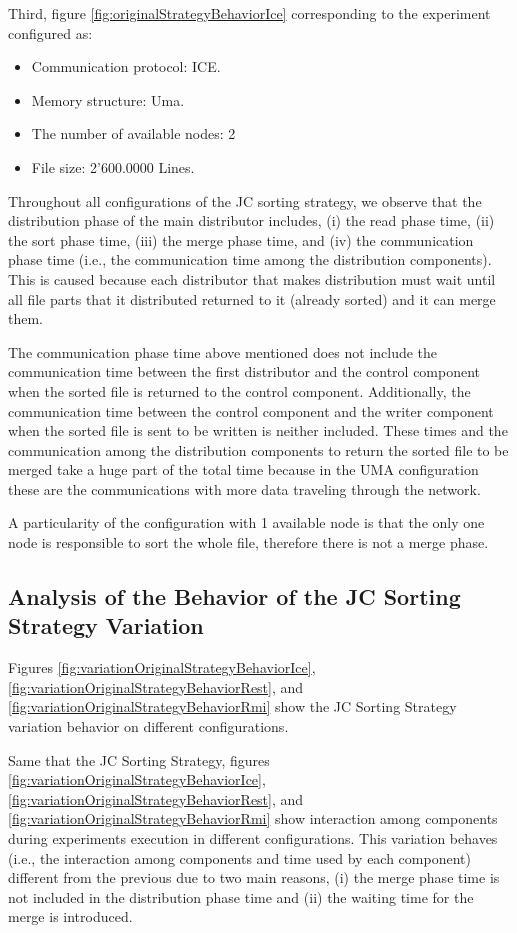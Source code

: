 Third, figure \ref{fig:originalStrategyBehaviorIce} corresponding to the experiment configured as: 
\begin{itemize}
	\item Communication protocol: ICE.
	\item  Memory structure: Uma.
	\item The number of available nodes: 2
	\item File size: 2'600.0000 Lines.
\end{itemize}

Throughout all configurations of the JC sorting strategy, we observe that the distribution phase of the main distributor includes, (i) the read phase time, (ii) the sort phase time, (iii) the merge phase time, and (iv) the communication phase time (i.e., the communication time among the distribution components). This is caused because each distributor that makes distribution must wait until all file parts that it distributed returned to it (already sorted) and it can merge them.

The communication phase time above mentioned does not include the communication time between the first distributor and the control component when the sorted file is returned to the control component. Additionally, the communication time between the control component and the writer component when the sorted file is sent to be written is neither included. These times and the communication among the distribution components to return the sorted file to be merged take a huge part of the total time because in the UMA configuration these are the communications with more data traveling through the network.

A particularity of the configuration with 1 available node is that the only one node is responsible to sort the whole file, therefore there is not a merge phase.
\subsection{Analysis of the Behavior of the JC Sorting Strategy Variation }

Figures \ref{fig:variationOriginalStrategyBehaviorIce}, \ref{fig:variationOriginalStrategyBehaviorRest}, and \ref{fig:variationOriginalStrategyBehaviorRmi} show the JC Sorting Strategy variation behavior on different configurations. 

Same that the JC Sorting Strategy, figures \ref{fig:variationOriginalStrategyBehaviorIce}, \ref{fig:variationOriginalStrategyBehaviorRest}, and \ref{fig:variationOriginalStrategyBehaviorRmi} show interaction among components during experiments execution in different configurations. This variation behaves (i.e., the interaction among components and time used by each component) different from the previous due to two main reasons, (i) the merge phase time is not included in the distribution phase time and (ii) the waiting time for the merge is introduced.

